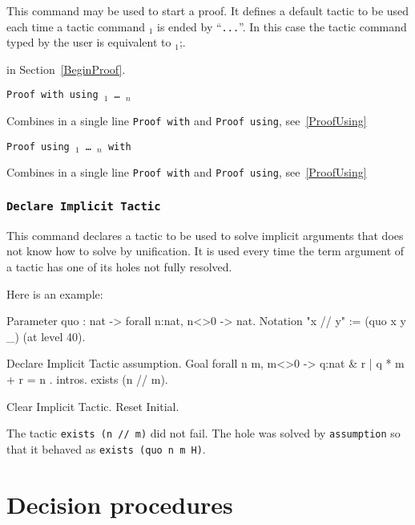 \begin{coq_example*}
  This command may be used to start a proof. It defines a default
  tactic to be used each time a tactic command {\tac$_1$} is ended by
  ``\verb#...#''. In this case the tactic command typed by the user is
  equivalent to \tac$_1$;{\tac}.

 in Section~\ref{BeginProof}.

\begin{Variants}

\item {\tt Proof with {\tac} using \ident$_1$ \mbox{\dots} \ident$_n$}

  Combines in a single line {\tt Proof with} and {\tt Proof using},
  see~\ref{ProofUsing}

\item {\tt Proof using \ident$_1$ \mbox{\dots} \ident$_n$ with {\tac}}

  Combines in a single line {\tt Proof with} and {\tt Proof using},
  see~\ref{ProofUsing}

\end{Variants}

\subsubsection{\tt Declare Implicit Tactic {\tac}}\label{DeclareImplicit}

This command declares a tactic to be used to solve implicit arguments
that {\Coq} does not know how to solve by unification. It is used
every time the term argument of a tactic has one of its holes not
fully resolved.

Here is an example:

\begin{coq_example}
Parameter quo : nat -> forall n:nat, n<>0 -> nat.
Notation "x // y" := (quo x y _) (at level 40).

Declare Implicit Tactic assumption.
Goal forall n m, m<>0 -> { q:nat & { r | q * m + r = n } }.
intros.
exists (n // m).
\end{coq_example}
\begin{coq_eval}
Clear Implicit Tactic.
Reset Initial.
\end{coq_eval}

The tactic {\tt exists (n // m)} did not fail. The hole was solved by
{\tt assumption} so that it behaved as {\tt exists (quo n m H)}.

\section{Decision procedures}


\end{coq_example*}
